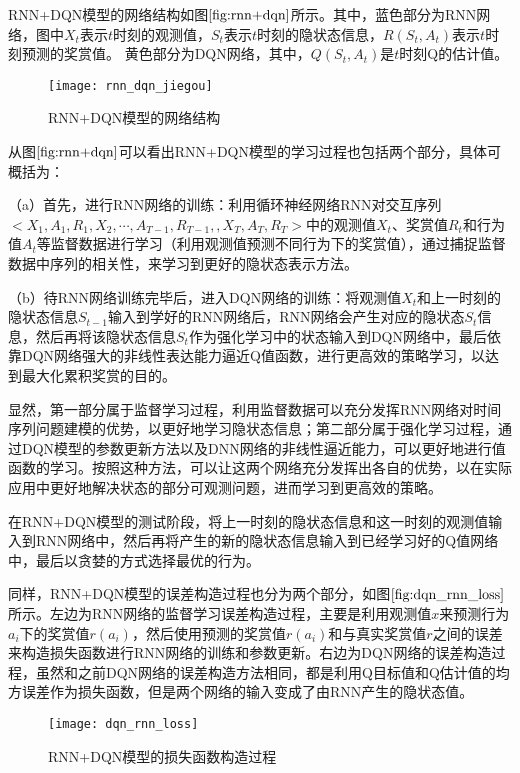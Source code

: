 RNN+DQN模型的网络结构如图$\ref{fig:rnn+dqn}$所示。其中，蓝色部分为RNN网络，图中$X_{t}$表示$t$时刻的观测值，$S_{t}$表示$t$时刻的隐状态信息，$R(S_{t}, A_{t})$表示$t$时刻预测的奖赏值。
黄色部分为DQN网络，其中，$Q(S_{t},A_{t})$是$t$时刻Q的估计值。
\begin{figure}[htbp]
\centering
\texttt{[image: rnn\_dqn\_jiegou]}
\caption{RNN+DQN模型的网络结构}
\label{fig:rnn+dqn}
\end{figure}

从图$\ref{fig:rnn+dqn}$可以看出RNN+DQN模型的学习过程也包括两个部分，具体可概括为：

（a）首先，进行RNN网络的训练：利用循环神经网络RNN对交互序列$<X_{1}, A_{1}, R_{1}, X_{2}, \cdots, A_{T-1}, R_{T-1}, ,X_{T}, A_{T}, R_{T}>$中的观测值$X_{t}$、奖赏值$R_{t}$和行为值$A_{t}$等监督数据进行学习（利用观测值预测不同行为下的奖赏值），通过捕捉监督数据中序列的相关性，来学习到更好的隐状态表示方法。

（b）待RNN网络训练完毕后，进入DQN网络的训练：将观测值$X_{t}$和上一时刻的隐状态信息$S_{t-1}$输入到学好的RNN网络后，RNN网络会产生对应的隐状态$S_{t}$信息，然后再将该隐状态信息$S_{t}$作为强化学习中的状态输入到DQN网络中，最后依靠DQN网络强大的非线性表达能力逼近Q值函数，进行更高效的策略学习，以达到最大化累积奖赏的目的。

显然，第一部分属于监督学习过程，利用监督数据可以充分发挥RNN网络对时间序列问题建模的优势，以更好地学习隐状态信息；第二部分属于强化学习过程，通过DQN模型的参数更新方法以及DNN网络的非线性逼近能力，可以更好地进行值函数的学习。按照这种方法，可以让这两个网络充分发挥出各自的优势，以在实际应用中更好地解决状态的部分可观测问题，进而学习到更高效的策略。

在RNN+DQN模型的测试阶段，将上一时刻的隐状态信息和这一时刻的观测值输入到RNN网络中，然后再将产生的新的隐状态信息输入到已经学习好的Q值网络中，最后以贪婪的方式选择最优的行为。

同样，RNN+DQN模型的误差构造过程也分为两个部分，如图$\ref{fig:dqn_rnn_loss}$所示。左边为RNN网络的监督学习误差构造过程，主要是利用观测值$x$来预测行为$a_{i}$下的奖赏值$r(a_{i})$，然后使用预测的奖赏值$r(a_{i})$和与真实奖赏值$r$之间的误差来构造损失函数进行RNN网络的训练和参数更新。右边为DQN网络的误差构造过程，虽然和之前DQN网络的误差构造方法相同，都是利用Q目标值和Q估计值的均方误差作为损失函数，但是两个网络的输入变成了由RNN产生的隐状态值。
\begin{figure}[htbp]
\centering
\texttt{[image: dqn\_rnn\_loss]}
\caption{RNN+DQN模型的损失函数构造过程}
\label{fig:dqn_rnn_loss}
\end{figure}

